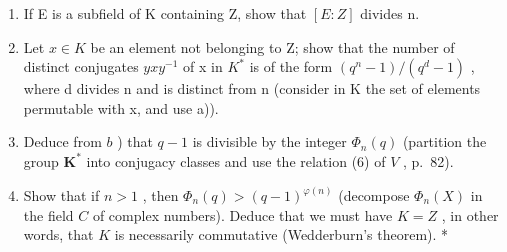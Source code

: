 \begin{enumerate}
\def\labelenumi{\alph{enumi})}
\item
  If E is a subfield of K containing Z, show that \([E:Z]\) divides n.
\item
  Let \(x \in K\) be an element not belonging to Z; show that the number of distinct conjugates \(yxy^{-1}\) of x in \(K^{*}\) is of the form \((q^{n}-1)/(q^{d}-1)\) , where d divides n and is distinct from n (consider in K the set of elements permutable with x, and use a)).
\item
  Deduce from \(b\) ) that \(q - 1\) is divisible by the integer \(\Phi_n(q)\) (partition the group \(\mathbf{K}^*\) into conjugacy classes and use the relation (6) of \(V\) , p.~82).
\item
  Show that if \(n > 1\) , then \(\Phi_n(q) > (q - 1)^{\varphi(n)}\) (decompose \(\Phi_n(X)\) in the field \(C\) of complex numbers). Deduce that we must have \(K = Z\) , in other words, that \(K\) is necessarily commutative (Wedderburn's theorem). *
\end{enumerate}

